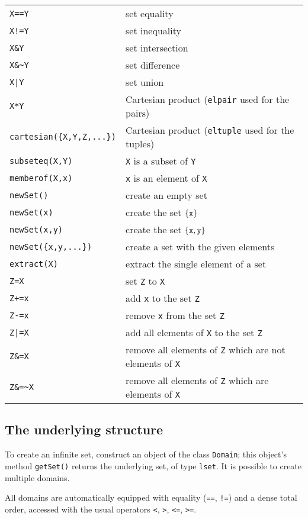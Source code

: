 \begin{tabular}{ll}
\verb-X==Y-&set equality \\
\verb-X!=Y-&set inequality \\
\verb-X&Y-&set intersection \\
\verb-X&~Y-&set difference \\
\verb-X|Y-&set union \\
\verb-X*Y-&Cartesian product (\verb-elpair- used for the pairs)\\
\verb-cartesian({X,Y,Z,...})-&Cartesian product (\verb-eltuple- used for the tuples)\\
\verb-subseteq(X,Y)-&\verb-X- is a subset of \verb-Y- \\
\verb-memberof(X,x)-&\verb-x- is an element of \verb-X- \\
\verb-newSet()-&create an empty set\\
\verb-newSet(x)-&create the set $\{\verb-x-\}$\\
\verb-newSet(x,y)-&create the set $\{\verb-x-, \verb-y-\}$\\
\verb-newSet({x,y,...})-&create a set with the given elements\\
\verb-extract(X)-&extract the single element of a set\\
\verb-Z=X-&set \verb-Z- to \verb-X-\\
\verb-Z+=x-&add \verb-x- to the set \verb-Z-\\
\verb|Z-=x|&remove \verb-x- from the set \verb-Z- \\
\verb-Z|=X-&add all elements of \verb-X- to the set \verb-Z-\\
\verb-Z&=X-&remove all elements of \verb-Z- which are not elements of \verb-X-\\
\verb-Z&=~X-&remove all elements of \verb-Z- which are elements of \verb-X- \\
\end{tabular}

\subsection{The underlying structure}
To create an infinite set, construct an object of the class {\tt Domain};
this object's method {\tt getSet()} returns the underlying set, of type {\tt lset}.
It is possible to create multiple domains.

All domains are automatically equipped with equality ({\tt ==}, {\tt !=}) and 
a dense total order, accessed with the usual operators {\tt <}, {\tt >}, {\tt <=}, {\tt >=}.

